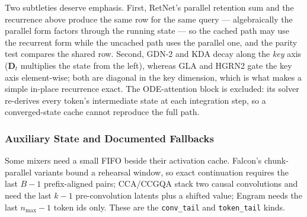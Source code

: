 Two subtleties deserve emphasis. First, RetNet's parallel retention sum and the recurrence above produce the same row for the same query --- algebraically the parallel form factors through the running state --- so the cached path may use the recurrent form while the uncached path uses the parallel one, and the parity test compares the shared row. Second, GDN-2 and KDA decay along the \emph{key} axis ($\mathbf{D}_t$ multiplies the state from the left), whereas GLA and HGRN2 gate the key axis element-wise; both are diagonal in the key dimension, which is what makes a simple in-place recurrence exact. The ODE-attention block is excluded: its solver re-derives every token's intermediate state at each integration step, so a converged-state cache cannot reproduce the full path.

\subsubsection{Auxiliary State and Documented Fallbacks}
\label{sec:kv-fallbacks}

Some mixers need a small FIFO beside their activation cache. Falcon's chunk-parallel variants bound a rehearsal window, so exact continuation requires the last $B-1$ prefix-aligned pairs; CCA/CCGQA stack two causal convolutions and need the last $k-1$ pre-convolution latents plus a shifted value; Engram needs the last $n_{\max}-1$ token ids only. These are the \texttt{conv\_tail} and \texttt{token\_tail} kinds.

